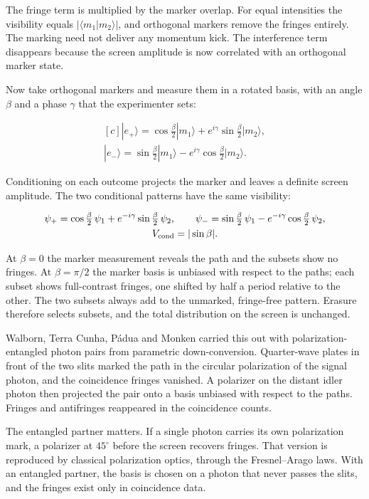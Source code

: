 \documentclass[11pt,oneside]{book}
\newenvironment{centeredalign}{\[\begin{gathered}[c]}{\end{gathered}\]}
\begin{document}
The fringe term is multiplied by the marker overlap. For equal intensities the visibility equals \(|\langle m_1|m_2\rangle|\), and orthogonal markers remove the fringes entirely. The marking need not deliver any momentum kick. The interference term disappears because the screen amplitude is now correlated with an orthogonal marker state.

Now take orthogonal markers and measure them in a rotated basis, with an angle \(\beta\) and a phase \(\gamma\) that the experimenter sets:

\begin{centeredalign}
|e_+\rangle=\cos\tfrac{\beta}{2}|m_1\rangle+e^{i\gamma}\sin\tfrac{\beta}{2}|m_2\rangle,\\
|e_-\rangle=\sin\tfrac{\beta}{2}|m_1\rangle-e^{i\gamma}\cos\tfrac{\beta}{2}|m_2\rangle.
\end{centeredalign}

Conditioning on each outcome projects the marker and leaves a definite screen amplitude. The two conditional patterns have the same visibility:

\begin{centeredalign}
\psi_+=\cos\tfrac{\beta}{2}\,\psi_1+e^{-i\gamma}\sin\tfrac{\beta}{2}\,\psi_2,\qquad
\psi_-=\sin\tfrac{\beta}{2}\,\psi_1-e^{-i\gamma}\cos\tfrac{\beta}{2}\,\psi_2,\\
V_{\rm cond}=|\sin\beta|.
\end{centeredalign}

At \(\beta=0\) the marker measurement reveals the path and the subsets show no fringes. At \(\beta=\pi/2\) the marker basis is unbiased with respect to the paths; each subset shows full-contrast fringes, one shifted by half a period relative to the other. The two subsets always add to the unmarked, fringe-free pattern. Erasure therefore selects subsets, and the total distribution on the screen is unchanged.

Walborn, Terra Cunha, Pádua and Monken carried this out with polarization-entangled photon pairs from parametric down-conversion. Quarter-wave plates in front of the two slits marked the path in the circular polarization of the signal photon, and the coincidence fringes vanished. A polarizer on the distant idler photon then projected the pair onto a basis unbiased with respect to the paths. Fringes and antifringes reappeared in the coincidence counts.

The entangled partner matters. If a single photon carries its own polarization mark, a polarizer at \(45^\circ\) before the screen recovers fringes. That version is reproduced by classical polarization optics, through the Fresnel--Arago laws. With an entangled partner, the basis is chosen on a photon that never passes the slits, and the fringes exist only in coincidence data.
\end{document}
